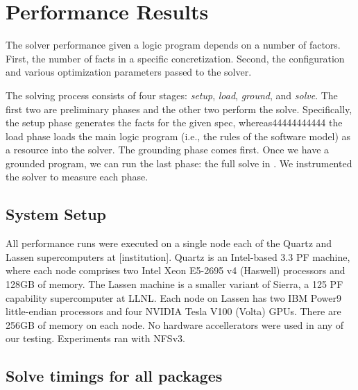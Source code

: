 \section{Performance Results}
\label{sec:perf-results}


The \clingo{} solver performance given a logic program depends on a number of factors.
First, the number of facts in a specific concretization. Second, the configuration and
various optimization parameters passed to the solver.

The solving process consists of four stages: \emph{setup}, \emph{load}, \emph{ground},
and \emph{solve}. The first two are preliminary phases and the other two perform the
solve. Specifically, the setup phase generates the facts for the given spec,
whereas44444444444 the load phase loads the main logic program (i.e., the rules of the
software model) as a resource into the solver. The grounding phase comes first. Once we
have a grounded program, we can run the last phase: the full solve in \clingo{}.
%
We instrumented the solver to measure each phase.

% 

% 



\subsection{System Setup}

All performance runs were executed on a single node each of the Quartz and Lassen
supercomputers at [institution].
Quartz is an Intel-based 3.3 PF machine, where each node comprises two Intel Xeon
E5-2695 v4 (Haswell) processors and 128GB of memory. The Lassen machine is a smaller
variant of Sierra, a 125 PF capability supercomputer at LLNL. Each node on Lassen has
two IBM Power9 little-endian processors and four NVIDIA Tesla V100 (Volta) GPUs. There
are 256GB of memory on each node. No hardware accellerators were used in any of our
testing. Experiments ran with NFSv3.

\subsection{Solve timings for all packages}

